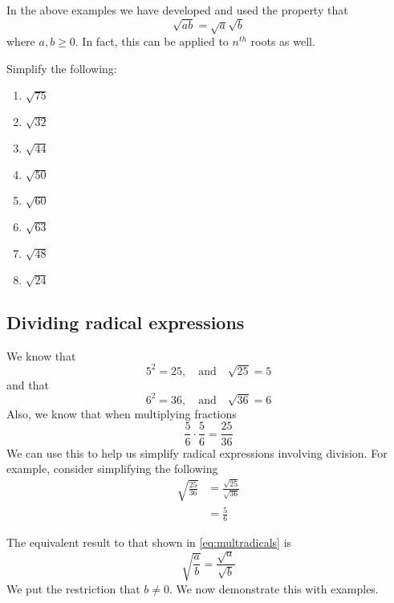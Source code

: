 \begin{myDefinition}
	In the above examples we have developed and used the property that
	\begin{equation}\label{eq:multradicals}
		\sqrt{ab} = \sqrt{a}\sqrt{b}
	\end{equation}
	where $a, b\geq 0$. In fact, this can be applied to $n^{th}$ roots as well.
\end{myDefinition} 

\begin{myexample}\label{ex:multradicalsdrillskill}
Simplify the following:
\drillandskill
\end{myexample}
\begin{multicols}{4}
	\begin{enumerate}
		\item $\sqrt{75}$ 
		\item $\sqrt{32}$ 
		\item $\sqrt{44}$ 
		\item $\sqrt{50}$ 
		\item $\sqrt{60}$ 
		\item $\sqrt{63}$ 
		\item $\sqrt{48}$ 
		\item $\sqrt{24}$ 
	\end{enumerate}
\end{multicols}

\subsection{Dividing radical expressions}
We know that
\[
	5^2 = 25, \quad {\mathrm{and}} \quad \sqrt{25}=5
\]
and that
\[
	6^2 = 36, \quad {\mathrm{and}} \quad \sqrt{36}=6
\]
Also, we know that when multiplying fractions
\[
	\frac{5}{6}\cdot \frac{5}{6} = \frac{25}{36}
\]
We can use this to help us simplify radical expressions involving division. For example, consider
simplifying the following
\begin{align*}
	\sqrt{\frac{25}{36}} & = \frac{\sqrt{25}}{\sqrt{36}} \\
	                     & = \frac{5}{6}                 
\end{align*} 
\begin{myDefinition}
	The equivalent result to that shown in \cref{eq:multradicals} is
	\[
		\sqrt{\frac{a}{b}} = \frac{\sqrt{a}}{\sqrt{b}}
	\]
	We put the restriction that $b\ne 0$. We now demonstrate this with examples.
\end{myDefinition} 

